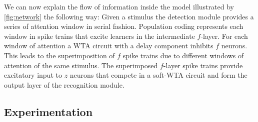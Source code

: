 \documentclass{report}
\begin{document}
We can now explain the flow of information inside the model illustrated by \cref{fig:network} the following way: Given a stimulus the detection module provides a series of attention window in serial fashion. Population coding represents each window in spike trains that excite learners in the intermediate $f$-layer. For each window of attention a WTA circuit with a delay component inhibits $f$ neurons. This leads to the superimposition of $f$ spike trains due to different windows of attention of the same stimulus. The superimposed $f$-layer spike trains provide excitatory input to $z$ neurons that compete in a soft-WTA circuit and form the output layer of the recognition module.

\subsection{Experimentation}
\end{document}
